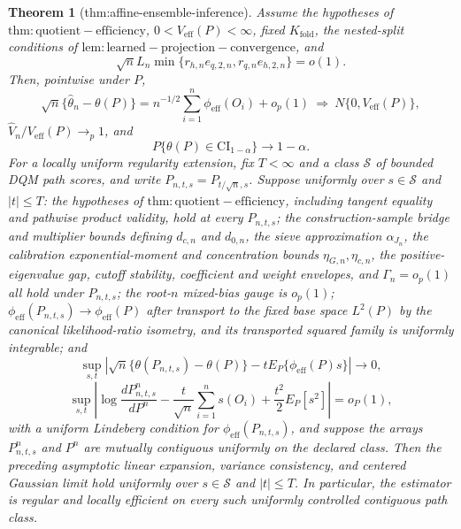 \documentclass{article}
\newtheorem{theorem}{Theorem}
\begin{document}
\begin{theorem}[thm:affine-ensemble-inference]\label{thm:affine-ensemble-inference}
Assume the hypotheses of \(\mathrm{thm:quotient-efficiency}\), \(0<V_{\mathrm{eff}}(P)<\infty\), fixed \(K_{\mathrm{fold}}\), the nested-split conditions of \(\mathrm{lem:learned-projection-convergence}\), and
\[
 \sqrt nL_n\min\{r_{h,n}e_{q,2,n},r_{q,n}e_{h,2,n}\}=o(1).
\]
Then, pointwise under \(P\),
\[
 \sqrt n\{\widehat\theta_n-\theta(P)\}
 =n^{-1/2}\sum_{i=1}^n\phi_{\mathrm{eff}}(O_i)+o_p(1)
 \ \Rightarrow\ N\{0,V_{\mathrm{eff}}(P)\},
\]
\(\widehat V_n/V_{\mathrm{eff}}(P)\to_p1\), and
\[
 P\{\theta(P)\in\mathrm{CI}_{1-\alpha}\}\to1-\alpha.
\]
For a locally uniform regularity extension, fix \(T<\infty\) and a class \(\mathcal S\) of bounded DQM path scores, and write \(P_{n,t,s}=P_{t/\sqrt n,s}\).  Suppose uniformly over \(s\in\mathcal S\) and \(|t|\le T\): the hypotheses of \(\mathrm{thm:quotient-efficiency}\), including tangent equality and pathwise product validity, hold at every \(P_{n,t,s}\); the construction-sample bridge and multiplier bounds defining \(d_{c,n}\) and \(d_{0,n}\), the sieve approximation \(\alpha_{J_n}\), the calibration exponential-moment and concentration bounds \(\eta_{G,n},\eta_{c,n}\), the positive-eigenvalue gap, cutoff stability, coefficient and weight envelopes, and \(\Gamma_n=o_p(1)\) all hold under \(P_{n,t,s}\); the root-\(n\) mixed-bias gauge is \(o_p(1)\); \(\phi_{\mathrm{eff}}(P_{n,t,s})\to\phi_{\mathrm{eff}}(P)\) after transport to the fixed base space \(L^2(P)\) by the canonical likelihood-ratio isometry, and its transported squared family is uniformly integrable; and
\[
 \sup_{s,t}\left|\sqrt n\{\theta(P_{n,t,s})-\theta(P)\}-tE_P\{\phi_{\mathrm{eff}}(P)s\}\right|\to0,
\]
\[
 \sup_{s,t}\left|\log\frac{dP_{n,t,s}^n}{dP^n}
 -\frac{t}{\sqrt n}\sum_{i=1}^ns(O_i)+\frac{t^2}{2}E_P[s^2]\right|=o_P(1),
\]
with a uniform Lindeberg condition for \(\phi_{\mathrm{eff}}(P_{n,t,s})\), and suppose the arrays \(P_{n,t,s}^n\) and \(P^n\) are mutually contiguous uniformly on the declared class.  Then the preceding asymptotic linear expansion, variance consistency, and centered Gaussian limit hold uniformly over \(s\in\mathcal S\) and \(|t|\le T\).  In particular, the estimator is regular and locally efficient on every such uniformly controlled contiguous path class.
\end{theorem}
\end{document}
